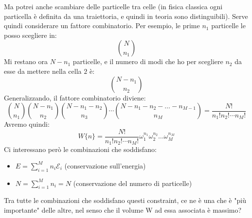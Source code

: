 \documentclass[12pt]{article}
\begin{document}
Ma potrei anche scambiare delle particelle tra celle (in fisica classica ogni particella è definita da una traiettoria, e quindi in teoria sono distinguibili). Serve quindi considerare un fattore combinatorio.
Per esempio, le prime $n_1$ particelle le posso scegliere in:
\[
\binom{N}{n_1}
\]
Mi restano ora $N-n_1$ particelle, e il numero di modi che ho per scegliere $n_2$ da esse da mettere nella cella $2$ è:
\[
\binom{N-n_1}{n_2}
\]
Generalizzando, il fattore combinatorio diviene:
\[
\binom{N}{n_1}\binom{N-n_1}{n_2}\binom{N-n_1-n_2}{n_3}\cdots\binom{N-n_1-n_2-\ldots-n_{M-1}}{n_M}=\frac{N!}{n_1!n_2!\cdots n_M!}
\]
Avremo quindi:
\[
W\{n\}=\frac{N!}{n_1!n_2!\cdots n_M!}\omega_1^{n_1}\omega_2^{n_2}\dots\omega_M^{n_M}
\]
Ci interessano però le combinazioni che soddisfano: 
\begin{itemize}
    \item $E= \sum_{i=1}^{M}{n_i\mathcal{E}_i}$  (conservazione sull'energia)
    \item $N= \sum_{i=1}^{M}{n_i=N}$  (conservazione del numero di particelle)
\end{itemize}
Tra tutte le combinazioni che soddisfano questi constraint, ce ne è una che è "più importante" delle altre, nel senso che il volume W ad essa associata è massimo?\\
\end{document}
